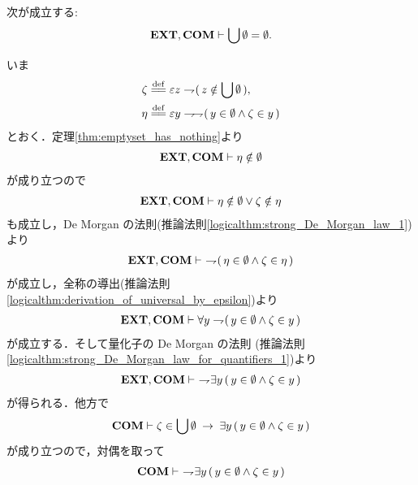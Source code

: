	\begin{screen}
		\begin{thm}[空集合の合併は空]\label{thm:the_union_of_the_emptyset_is_empty}
			次が成立する:
			\begin{align}
				\mbox{{\bf EXT}},\mbox{\bf COM} \vdash \bigcup \emptyset = \emptyset.
			\end{align}
		\end{thm}
	\end{screen}
	
	\begin{sketch}
		いま
		\begin{align}
			\zeta &\defeq \varepsilon z \negation (\, z \notin \bigcup \emptyset\, ), \\
			\eta &\defeq \varepsilon y \negation \negation (\, y \in \emptyset \wedge \zeta \in y\, )
		\end{align}
		とおく．定理\ref{thm:emptyset_has_nothing}より
		\begin{align}
			\mbox{{\bf EXT}},\mbox{\bf COM} \vdash \eta \notin \emptyset
		\end{align}
		が成り立つので
		\begin{align}
			\mbox{{\bf EXT}},\mbox{\bf COM} \vdash \eta \notin \emptyset \vee \zeta \notin \eta
		\end{align}
		も成立し，De Morgan の法則(推論法則\ref{logicalthm:strong_De_Morgan_law_1})より
		\begin{align}
			\mbox{{\bf EXT}},\mbox{\bf COM} \vdash\ \rightharpoondown\hspace{-0.25em} (\, \eta \in \emptyset \wedge \zeta \in \eta\, )
		\end{align}
		が成立し，全称の導出(推論法則\ref{logicalthm:derivation_of_universal_by_epsilon})より
		\begin{align}
			\mbox{{\bf EXT}},\mbox{\bf COM} \vdash \forall y \rightharpoondown\hspace{-0.25em} (\, y \in \emptyset \wedge \zeta \in y\, )
		\end{align}
		が成立する．そして量化子の De Morgan の法則
		(推論法則\ref{logicalthm:strong_De_Morgan_law_for_quantifiers_1})より
		\begin{align}
			\mbox{{\bf EXT}},\mbox{\bf COM} \vdash\ \rightharpoondown\hspace{-0.25em} \exists y\, (\, y \in \emptyset \wedge \zeta \in y\, )
			\label{fom:the_union_of_the_emptyset_is_empty_1}
		\end{align}
		が得られる．他方で
		\begin{align}
			\mbox{\bf COM} \vdash \zeta \in \bigcup \emptyset
			\hspace{0.25em}\rightarrow\hspace{0.25em} \exists y\, (\, y \in \emptyset \wedge \zeta \in y\, )
		\end{align}
		が成り立つので，対偶を取って
		\begin{align}
			\COMAX \vdash\ 
			\negation \exists y\, (\, y \in \emptyset \wedge \zeta \in y\, )

\end{align}
\end{sketch}

